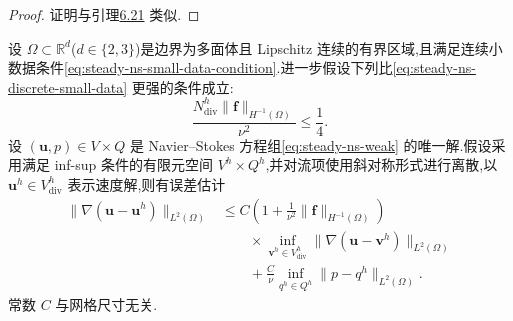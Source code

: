 \begin{proof}
证明与引理\hyperref[lem:steady-ns-stability]{6.21} 类似.
\end{proof}

\begin{theorem}\label{thm:steady-ns-fem-error-gradient}
设 $\Omega\subset\mathbb{R}^d$($d\in\{2,3\}$)是边界为多面体且 Lipschitz 连续的有界区域,且满足连续小数据条件\cref{eq:steady-ns-small-data-condition}.进一步假设下列比\cref{eq:steady-ns-discrete-small-data} 更强的条件成立:
\begin{equation}\label{eq:steady-ns-discrete-small-data-quarter}
  \frac{N_{\mathrm{div}}^h\|\bm{f}\|_{H^{-1}(\Omega)}}{\nu^2}
    \le\frac14.
\end{equation}
设 $(\bm{u},p)\in V\times Q$ 是 Navier--Stokes 方程组\cref{eq:steady-ns-weak} 的唯一解.假设采用满足 inf-sup 条件的有限元空间 $V^h\times Q^h$,并对流项使用斜对称形式进行离散,以 $\bm{u}^h\in V_{\mathrm{div}}^h$ 表示速度解,则有误差估计
\begin{equation}\label{eq:steady-ns-error-gradient}
\begin{aligned}
  \|\nabla(\bm{u}-\bm{u}^h)\|_{L^2(\Omega)}
   &\le C\left(1+\frac1{\nu^2}\|\bm{f}\|_{H^{-1}(\Omega)}\right)\\
   &\qquad\times\inf_{\bm{v}^h\in V_{\mathrm{div}}^h}
          \|\nabla(\bm{u}-\bm{v}^h)\|_{L^2(\Omega)}\\
   &\qquad+\frac{C}{\nu}
       \inf_{q^h\in Q^h}\|p-q^h\|_{L^2(\Omega)}.
\end{aligned}
\end{equation}
常数 $C$ 与网格尺寸无关.
\end{theorem}

